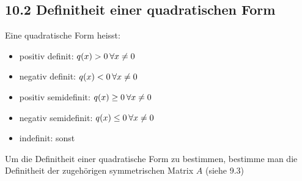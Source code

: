 \subsection{10.2 Definitheit einer quadratischen Form}{
\vskip1pt

Eine quadratische Form heisst:

\vspace{-4pt}
\begin{center}
\begin{minipage}[c]{0.8 \columnwidth}
\begin{itemize}[leftmargin=0.29cm, itemsep=0pt]
\item positiv definit: \hskip27pt $q(x) > 0 \hskip2pt \forall x \neq 0$
\item negativ definit: \hskip25pt $q(x) < 0 \hskip2pt\forall x \neq 0$
\item positiv semidefinit: \hskip13pt $q(x) \geq 0 \hskip2pt \forall x \neq 0$
\item negativ semidefinit: \hskip11pt $q(x) \leq 0 \hskip2pt \forall x \neq 0$
\item indefinit: \hskip45pt sonst
\end{itemize}
\end{minipage}
\end{center}

Um die Definitheit einer quadratische Form zu bestimmen, bestimme man die Definitheit der zugehörigen symmetrischen Matrix $A$ (siehe 9.3)

}
\WhiteSpace